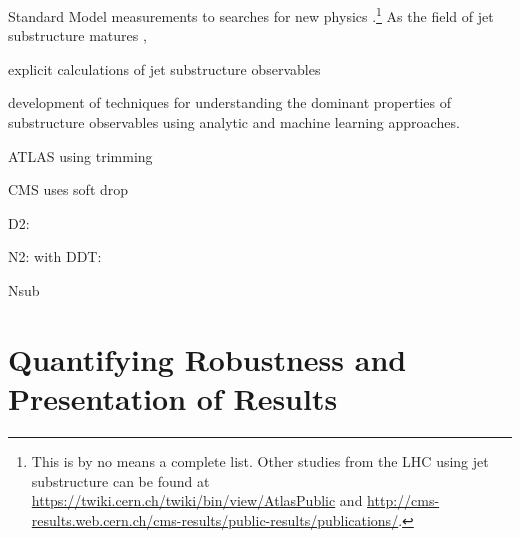 \documentclass[11pt,letterpaper]{article}
\begin{document}
 Standard Model measurements \cite{Chatrchyan:2012sn,CMS:2013cda,Aad:2015cua,Aad:2015lxa,ATLAS-CONF-2015-035,Aad:2015rpa,Aad:2015hna,ATLAS-CONF-2016-002,ATLAS-CONF-2016-039,ATLAS-CONF-2016-034,CMS-PAS-TOP-16-013,CMS-PAS-HIG-16-004} to searches for new physics \cite{CMS:2011bqa,Fleischmann:2013woa,Pilot:2013bla,TheATLAScollaboration:2013qia,Chatrchyan:2012ku,CMS-PAS-B2G-14-001,CMS-PAS-B2G-14-002,Khachatryan:2015axa,Khachatryan:2015bma,Aad:2015owa,Aaboud:2016okv,Aaboud:2016trl,Aaboud:2016qgg,ATLAS-CONF-2016-055,ATLAS-CONF-2015-071,ATLAS-CONF-2015-068,CMS-PAS-EXO-16-037,CMS-PAS-EXO-16-040,Khachatryan:2016mdm,CMS-PAS-HIG-16-016,CMS-PAS-B2G-15-003,CMS-PAS-EXO-16-017}.\footnote{This is by no means a complete list.  Other studies from the LHC using jet substructure can be found at \url{https://twiki.cern.ch/twiki/bin/view/AtlasPublic} and \url{http://cms-results.web.cern.ch/cms-results/public-results/publications/}.}  As the field of jet substructure matures \cite{Abdesselam:2010pt,Altheimer:2012mn,Altheimer:2013yza,Adams:2015hiv}, 
 
 
 
  explicit calculations of jet substructure observables \cite{Feige:2012vc,Field:2012rw,Dasgupta:2013ihk,Dasgupta:2013via,Larkoski:2014pca,Dasgupta:2015yua,Seymour:1997kj,Li:2011hy,Larkoski:2012eh,Jankowiak:2012na,Chien:2014nsa,Chien:2014zna,Isaacson:2015fra,Krohn:2012fg,Waalewijn:2012sv,Larkoski:2014tva,Procura:2014cba,Bertolini:2015pka,Bhattacherjee:2015psa,Larkoski:2015kga,Dasgupta:2015lxh,Frye:2016okc,Frye:2016aiz,Kang:2016ehg,Hornig:2016ahz} 
  \cite{Marzani:2017mva}
  
   development of techniques for understanding the dominant properties of substructure observables using analytic \cite{Walsh:2011fz,Larkoski:2014gra,Larkoski:2014zma} and machine learning \cite{Cogan:2014oua,deOliveira:2015xxd,Almeida:2015jua,Baldi:2016fql,Guest:2016iqz,Conway:2016caq,Barnard:2016qma} approaches.


ATLAS using trimming \cite{Krohn:2009th}

CMS uses soft drop\cite{Larkoski:2014wba}

D2:\cite{Larkoski:2015kga}\cite{Larkoski:2014gra}

N2:\cite{Moult:2016cvt}
with DDT:\cite{Dolen:2016kst}

Nsub\cite{Thaler:2010tr}\cite{Thaler:2011gf}

\section{Quantifying Robustness and Presentation of Results}
\end{document}
